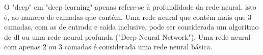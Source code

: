 O "deep" em "deep learning" apenas refere-se à profundidade da rede neural, isto é, ao numero de camadas que contém. Uma rede neural que contém mais que 3 camadas, com as de entrada e saída inclusive, pode ser considerada um algoritmo de \ac{dl} ou uma rede neural profunda ("Deep Neural Network"). Uma rede neural com apenas 2 ou 3 camadas é considerada uma rede neural básica.